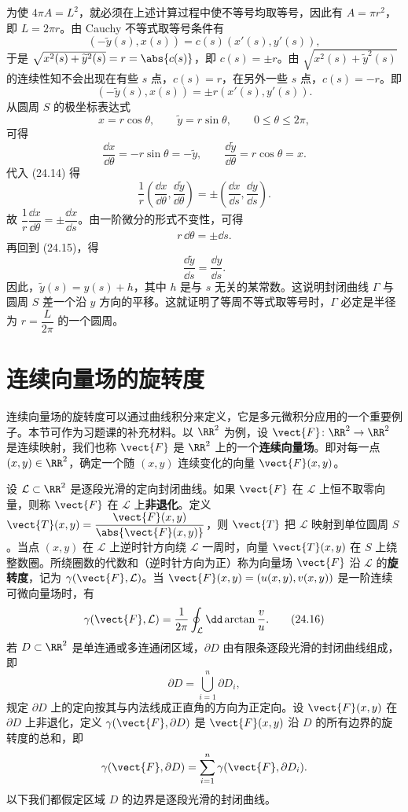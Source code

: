为使 $4\pi A=L^2$，就必须在上述计算过程中使不等号均取等号，因此有 $A=\pi r^2$，即 $L=2\pi r$。由 Cauchy 不等式取等号条件有
\[
  (-\widetilde y(s),x(s))=c(s)(x'(s),y'(s)),
\]
于是 $\sqrt{x^2(s)+\widetilde y^2(s)}=r=\abs{c(s)}$，即 $c(s)=\pm r$。由 $\sqrt{x^2(s)+\widetilde y^2(s)}$ 的连续性知不会出现在有些 $s$ 点，$c(s)=r$，在另外一些 $s$ 点，$c(s)=-r$。即
\begin{equation}
  (-\widetilde y(s),x(s))=\pm r(x'(s),y'(s)).
  \tag{24.14}
  \label{eq:24.14}
\end{equation}
从圆周 $S$ 的极坐标表达式
\[
  x=r\cos\theta,\qquad \widetilde y=r\sin\theta,\qquad0\le\theta\le2\pi,
\]
可得
\[
  \frac{\dd x}{\dd\theta}=-r\sin\theta=-\widetilde y,\qquad
  \frac{\dd\widetilde y}{\dd\theta}=r\cos\theta=x.
\]
代入 (24.14) 得
\begin{equation}
  \frac1r\left(\frac{\dd x}{\dd\theta},\frac{\dd\widetilde y}{\dd\theta}\right)
  =\pm\left(\frac{\dd x}{\dd s},\frac{\dd y}{\dd s}\right).
  \tag{24.15}
  \label{eq:24.15}
\end{equation}
故 $\dfrac1r\dfrac{\dd x}{\dd\theta}=\pm\dfrac{\dd x}{\dd s}$。由一阶微分的形式不变性，可得
\[
  r\,\dd\theta=\pm\dd s.
\]
再回到 (24.15)，得
\[
  \frac{\dd\widetilde y}{\dd s}=\frac{\dd y}{\dd s}.
\]
因此，$\widetilde y(s)=y(s)+h$，其中 $h$ 是与 $s$ 无关的某常数。这说明封闭曲线 $\Gamma$ 与圆周 $S$ 差一个沿 $y$ 方向的平移。这就证明了等周不等式取等号时，$\Gamma$ 必定是半径为 $r=\dfrac{L}{2\pi}$ 的一个圆周。

\section{连续向量场的旋转度}

连续向量场的旋转度可以通过曲线积分来定义，它是多元微积分应用的一个重要例子。本节可作为习题课的补充材料。以 $\RR^2$ 为例，设 $\vect{F}\colon\RR^2\to\RR^2$ 是连续映射，我们也称 $\vect{F}$ 是 $\RR^2$ 上的一个\textbf{连续向量场}。即对每一点 $(x,y)\in\RR^2$，确定一个随 $(x,y)$ 连续变化的向量 $\vect{F}(x,y)$。

设 $\mathcal L\subset\RR^2$ 是逐段光滑的定向封闭曲线。如果 $\vect{F}$ 在 $\mathcal L$ 上恒不取零向量，则称 $\vect{F}$ 在 $\mathcal L$ 上\textbf{非退化}。定义 $\vect{T}(x,y)=\dfrac{\vect{F}(x,y)}{\abs{\vect{F}(x,y)}}$，则 $\vect{T}$ 把 $\mathcal L$ 映射到单位圆周 $S$。当点 $(x,y)$ 在 $\mathcal L$ 上逆时针方向绕 $\mathcal L$ 一周时，向量 $\vect{T}(x,y)$ 在 $S$ 上绕整数圈。所绕圈数的代数和（逆时针方向为正）称为向量场 $\vect{F}$ 沿 $\mathcal L$ 的\textbf{旋转度}，记为 $\gamma(\vect{F},\mathcal L)$。当 $\vect{F}(x,y)=(u(x,y),v(x,y))$ 是一阶连续可微向量场时，有
\begin{equation}
  \gamma(\vect{F},\mathcal L)=\frac1{2\pi}\oint_\mathcal L\dd\arctan\frac vu.
  \tag{24.16}
  \label{eq:24.16}
\end{equation}
若 $D\subset\RR^2$ 是单连通或多连通闭区域，$\partial D$ 由有限条逐段光滑的封闭曲线组成，即
\[
  \partial D=\bigcup_{i=1}^n\partial D_i,
\]
规定 $\partial D$ 上的定向按其与内法线成正直角的方向为正定向。设 $\vect{F}(x,y)$ 在 $\partial D$ 上非退化，定义 $\gamma(\vect{F},\partial D)$ 是 $\vect{F}(x,y)$ 沿 $D$ 的所有边界的旋转度的总和，即
\[
  \gamma(\vect{F},\partial D)=\sum_{i=1}^n\gamma(\vect{F},\partial D_i).
\]
以下我们都假定区域 $D$ 的边界是逐段光滑的封闭曲线。

